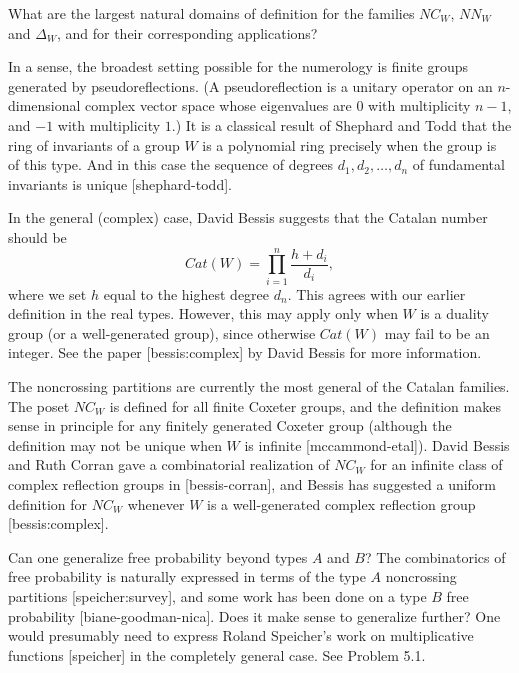 \documentclass[12pt,letterpaper, reqno]{amsart}
\begin{document}
\begin{problemblock}

\begin{problem}[1.3]
What are the largest natural domains of definition for the families $NC_W$, $NN_W$ and $\Delta_W$, and for their corresponding applications?
\end{problem}

\begin{remark}
In a sense, the broadest setting possible for the numerology is  finite
groups generated by pseudoreflections. (A pseudoreflection is a unitary
operator on an $n$-dimensional complex vector space whose eigenvalues
are $0$ with multiplicity $n-1$, and $-1$ with multiplicity $1$.) It is
a classical result of Shephard and Todd that the ring of invariants of
a group $W$ is a polynomial ring precisely when the group is of this
type. And in this case the sequence of degrees $d_1,d_2,\ldots,d_n$
of fundamental invariants is unique [shephard-todd].

In the general (complex) case, David Bessis suggests that the Catalan number should be
$$
Cat(W)= \prod_{i=1}^n  \frac{h+d_i}{d_i},
$$
where we set $h$ equal to the highest degree $d_n$. This agrees with our earlier definition in the real types. However, this may apply only when $W$ is a duality group (or a well-generated group), since otherwise $Cat(W)$ may fail to be an integer. See the paper [bessis:complex] by David Bessis for more information.
\end{remark}

\begin{remark}
The noncrossing partitions are currently the most general of the Catalan families. The poset $NC_W$ is defined for all finite Coxeter groups, and the definition makes sense in principle for any finitely generated Coxeter group (although the definition may not be unique when $W$ is infinite [mccammond-etal]). David Bessis and Ruth Corran gave a combinatorial realization of $NC_W$ for an infinite class of complex reflection groups in [bessis-corran], and Bessis has suggested a uniform definition for $NC_W$ whenever $W$ is a well-generated complex reflection group [bessis:complex].
\end{remark}

\begin{remark}
Can one generalize free probability beyond types $A$ and $B$? The combinatorics of free probability is naturally expressed in terms of the type $A$ noncrossing partitions [speicher:survey], and some work has been done on a type $B$ free probability [biane-goodman-nica]. Does it make sense to generalize further? One would presumably need to express Roland Speicher's work on multiplicative functions [speicher] in the completely general case. See Problem 5.1.
\end{remark}


\end{problemblock}
\end{document}
